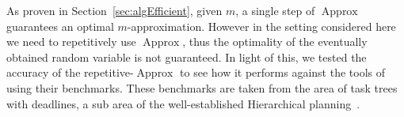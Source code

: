\documentclass[letterpaper]{article} %
\DeclareMathOperator{\KlmApprox}{Approx}
\begin{document}
As proven in Section~\ref{sec:algEfficient}, given $m$, a single step of $\KlmApprox$ guarantees an optimal $m$-approximation. However in the setting considered here we need to repetitively use $\KlmApprox$, thus the optimality of the eventually obtained random variable is not guaranteed. In light of this, we tested the accuracy of the repetitive-$\KlmApprox$ to see how it performs against the tools of~\cite{cohen2015estimating,CohenGW18} using their benchmarks. These benchmarks are taken from the area of task trees with deadlines, a sub area of the well-established Hierarchical planning~\cite{thomas1988hierarchical,alford2016hierarchical,xiao2017hierarchical}.



\end{document}

